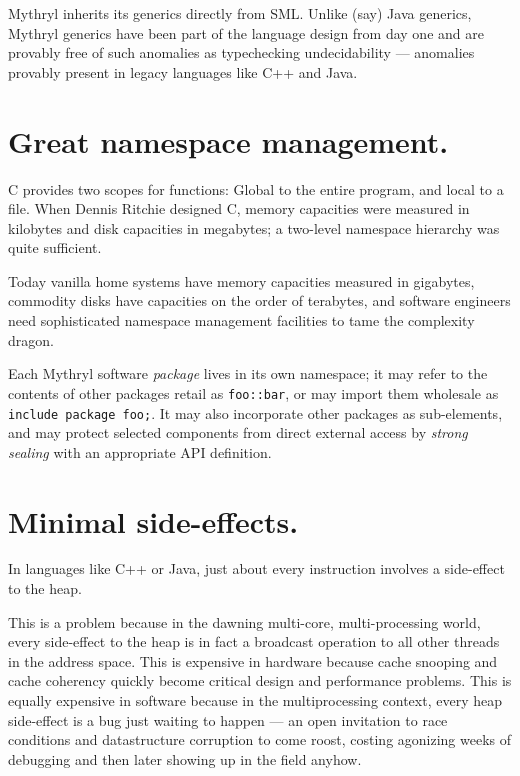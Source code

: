 Mythryl inherits its generics directly from {\sc SML}.  Unlike 
(say) Java generics, Mythryl generics have been part of the language 
design from day one and are provably free of such anomalies as 
typechecking undecidability --- anomalies provably present in legacy 
languages like C++ and Java.



\section{Great namespace management.}

C provides two scopes for functions:  Global to the entire program, 
and local to a file.  When Dennis Ritchie designed C, memory 
capacities were measured in kilobytes and disk capacities in megabytes; 
a two-level namespace hierarchy was quite sufficient.

Today vanilla home systems have memory capacities measured in gigabytes, 
commodity disks have capacities on the order of terabytes, and software engineers 
need sophisticated namespace management facilities to tame the complexity 
dragon.

Each Mythryl software {\em package} lives in its own namespace;  it may 
refer to the contents of other packages retail as {\tt foo::bar}, 
or may import them wholesale as {\tt include package   foo;}.  It may also 
incorporate other packages as sub-elements, and may protect 
selected components from direct external access by {\em strong sealing} 
with an appropriate {\sc API} definition.


\section{Minimal side-effects.}

In languages like C++ or Java, just about every instruction involves 
a side-effect to the heap.

This is a problem because in the dawning multi-core, multi-processing 
world, every side-effect to the heap is in fact a broadcast operation 
to all other threads in the address space.  This is expensive in hardware 
because cache snooping and cache coherency quickly become critical design 
and performance problems.  This is equally expensive in software because 
in the multiprocessing context, every heap side-effect is a bug just waiting 
to happen --- an open invitation to race conditions and datastructure 
corruption to come roost, costing agonizing weeks of debugging and then 
later showing up in the field anyhow.

